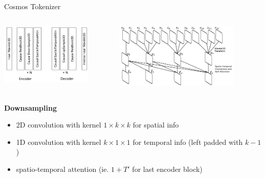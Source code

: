 \documentclass{beamer}
\begin{document}
\begin{frame}[t]{Cosmos Tokenizer}
    \vspace{-2em}
	\begin{columns}[t]
		\begin{column}{.5\textwidth}
            \begin{center}
                \includegraphics[width=0.8\textwidth]{./img/tokenizer_2.png}
            \end{center}
		\end{column}
		\begin{column}{.5\textwidth}
            \begin{center}
                \includegraphics[width=0.8\textwidth]{./img/tokenizer_3.png}
            \end{center}
		\end{column}
	\end{columns}
    \textbf{Downsampling}
    \begin{itemize}[label=-]
        \item 2D convolution with kernel $1 \times k \times k$ for spatial info 
        \item 1D convolution with kernel $k \times 1 \times 1$ for temporal info (left padded with $k-1$)
        \item spatio-temporal attention (ie. $1 + T'$ for last encoder block)
    \end{itemize}
\end{frame}
\end{document}
